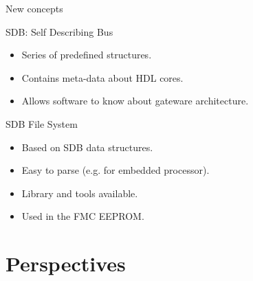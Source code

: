 \documentclass[compress,red]{beamer}
\begin{document}
\begin{frame}{New concepts}

  \begin{block}{SDB: Self Describing Bus}
    \begin{itemize}
    \item Series of predefined structures.
    \item Contains meta-data about HDL cores.
    \item Allows software to know about gateware architecture.
    \end{itemize}
  \end{block}

  \begin{block}{SDB File System}
    \begin{itemize}
    \item Based on SDB data structures.
    \item Easy to parse (e.g. for embedded processor).
    \item Library and tools available. %
    \item Used in the FMC EEPROM.
    \end{itemize}
  \end{block}


\end{frame}



\section{Perspectives}

\subsection*{} %
\end{document}
